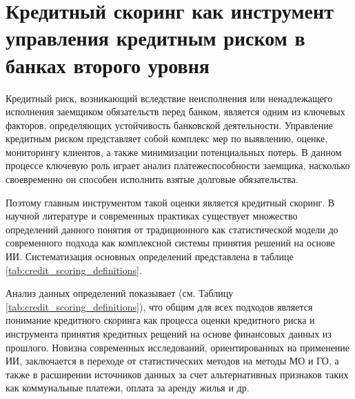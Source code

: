 %       
%       
%       

\section{Кредитный скоринг как инструмент управления кредитным риском в банках второго уровня}

Кредитный риск, возникающий вследствие неисполнения или ненадлежащего исполнения заемщиком обязательств перед банком, является одним из ключевых факторов, определяющих устойчивость банковской деятельности. Управление кредитным риском представляет собой комплекс мер по выявлению, оценке, мониторингу клиентов, а также минимизации потенциальных потерь. В данном процессе ключевую роль играет анализ платежеспособности заемщика, насколько своевременно он способен исполнить взятые долговые обязательства. 

Поэтому главным инструментом такой оценки является кредитный скоринг. В научной литературе и современных практиках существует множество определений данного понятия от традиционного как статистической модели до современного подхода как комплексной системы принятия решений на основе ИИ. Систематизация основных определений представлена в таблице \ref{tab:credit_scoring_definitions}.

Анализ данных определений показывает (см. Таблицу \ref{tab:credit_scoring_definitions}), что общим для всех подходов является понимание кредитного скоринга как процесса оценки кредитного риска и инструмента принятия кредитных рещений на основе финансовых данных из прошлого. Новизна современных исследований, ориентированных на применение ИИ, заключается в переходе от статистических методов на методы МО и ГО, а также в расширении источников данных за счет альтернативных признаков таких как коммунальные платежи, оплата за аренду жилья и др.

